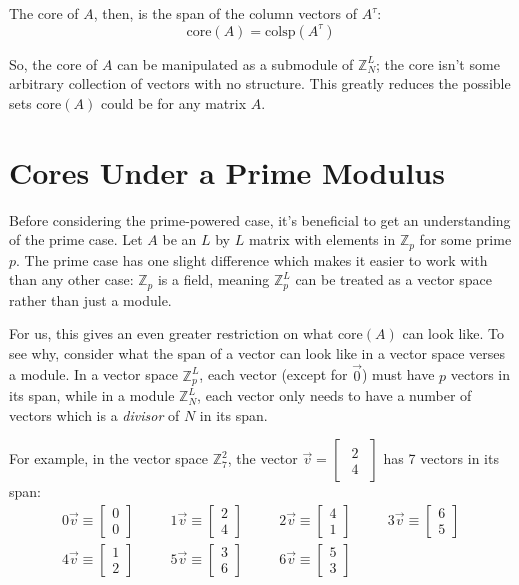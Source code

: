\documentclass[a4paper, 12pt, reqno]{amsart}
\newcommand{\ssection}[1]{\vspace{1cm}\section{#1}}
\begin{document}
	The core of $A$, then, is the span of the column vectors of $A^{\tau}$:
	\[
		\text{core}(A) = \text{colsp}(A^{\tau})
	\]
	
	So, the core of $A$ can be manipulated as a submodule of $\mathds{Z}_{N}^{L}$; the core isn't some arbitrary
	collection of vectors with no structure. This greatly reduces the possible sets core$(A)$ could be for
	any matrix $A$.
	
	\ssection{Cores Under a Prime Modulus}
	Before considering the prime-powered case, it's beneficial to get an understanding of the prime case.
	Let $A$ be an $L$ by $L$ matrix with elements in $\mathds{Z}_{p}$ for some prime $p$.	The prime case has
	one slight difference which makes it easier to work with than any other case: $\mathds{Z}_{p}$ is a field,
	meaning $\mathds{Z}_{p}^{L}$ can be treated as a vector space rather than just a module.

	For us, this gives an even greater restriction on what core$(A)$ can look like. To see why, consider what
	the span of a vector can look like in a vector space verses a module. In a vector space $\mathds{Z}_{p}^{L}$,
	each vector (except for $\vec{0}$) must have $p$ vectors in its span, while in a module $\mathds{Z}_{N}^{L}$,
	each vector only needs to have a number of vectors which is a \emph{divisor} of $N$ in its span.
	
	For example, in the vector space $\mathds{Z}_{7}^{2}$, the vector $\vec{v} = 
		\begin{bmatrix}
			\begin{smallmatrix}
				2 \\
				4
			\end{smallmatrix}
		\end{bmatrix}
	$
	has 7 vectors in its span:
	\begin{align*}
		0\vec{v} \equiv
		\begin{bmatrix}
			0 \\
			0
		\end{bmatrix} &
		\quad &
		1\vec{v} \equiv
		\begin{bmatrix}
			2 \\
			4
		\end{bmatrix} &
		\quad &
		2\vec{v} \equiv
		\begin{bmatrix}
			4 \\
			1
		\end{bmatrix} &
		\quad &
		3\vec{v} \equiv
		\begin{bmatrix}
			6 \\
			5
		\end{bmatrix} \\
		4\vec{v} \equiv
		\begin{bmatrix}
			1 \\
			2
		\end{bmatrix} &
		\quad &
		5\vec{v} \equiv
		\begin{bmatrix}
			3 \\
			6
		\end{bmatrix} &
		\quad &
		6\vec{v} \equiv
		\begin{bmatrix}
			5 \\
			3
		\end{bmatrix} &
		\quad
	\end{align*}
	
\end{document}
